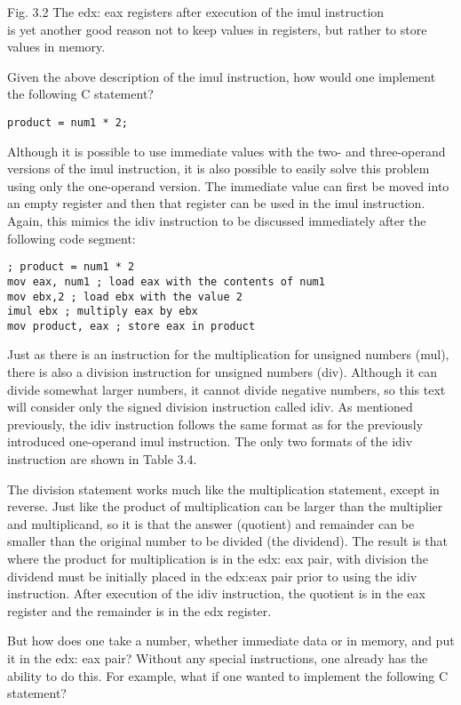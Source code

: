 \documentclass[10pt]{article}
\begin{document}
Fig. 3.2 The edx: eax registers after execution of the imul instruction\\
is yet another good reason not to keep values in registers, but rather to store values in memory.

Given the above description of the imul instruction, how would one implement the following C statement?

\begin{verbatim}
product = num1 * 2;
\end{verbatim}

Although it is possible to use immediate values with the two- and three-operand versions of the imul instruction, it is also possible to easily solve this problem using only the one-operand version. The immediate value can first be moved into an empty register and then that register can be used in the imul instruction. Again, this mimics the idiv instruction to be discussed immediately after the following code segment:

\begin{verbatim}
; product = num1 * 2
mov eax, num1 ; load eax with the contents of num1
mov ebx,2 ; load ebx with the value 2
imul ebx ; multiply eax by ebx
mov product, eax ; store eax in product
\end{verbatim}

Just as there is an instruction for the multiplication for unsigned numbers (mul), there is also a division instruction for unsigned numbers (div). Although it can divide somewhat larger numbers, it cannot divide negative numbers, so this text will consider only the signed division instruction called idiv. As mentioned previously, the idiv instruction follows the same format as for the previously introduced one-operand imul instruction. The only two formats of the idiv instruction are shown in Table 3.4.

The division statement works much like the multiplication statement, except in reverse. Just like the product of multiplication can be larger than the multiplier and multiplicand, so it is that the answer (quotient) and remainder can be smaller than the original number to be divided (the dividend). The result is that where the product for multiplication is in the edx: eax pair, with division the dividend must be initially placed in the edx:eax pair prior to using the idiv instruction. After execution of the idiv instruction, the quotient is in the eax register and the remainder is in the edx register.

But how does one take a number, whether immediate data or in memory, and put it in the edx: eax pair? Without any special instructions, one already has the ability to do this. For example, what if one wanted to implement the following C statement?
\end{document}
